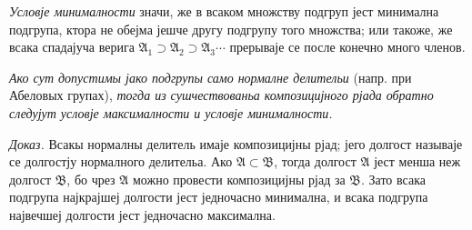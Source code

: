 ﻿\documentclass[11pt]{article}
\providecommand{\mA}{\mathfrak{A}}
\providecommand{\mB}{\mathfrak{B}}
\begin{document}
\emph{Условје минималности} значи, же в всаком множству подгруп јест минимална подгрупа, ктора не обејма јешче другу подгрупу того множства; или такоже, же всака спадајуча верига $\mA_1\supset\mA_2\supset\mA_3\cdots$ прерываје се после конечно много членов.

\emph{Ако сут допустимы јако подгрупы само нормалне делительи} (напр. при Абеловых групах), \emph{тогда из сушчествованьа композицијного рјада обратно следујут условје максималности и условје минималности.}

\emph{Доказ.} Всакы нормалны делитель имаје композицијны рјад; јего долгост называје се долгостју нормалного делительа. Ако $\mA\subset\mB$, тогда долгост $\mA$ јест менша неж долгост $\mB$, бо чрез $\mA$ можно провести композицијны рјад за $\mB$. Зато всака подгрупа најкрајшеј долгости јест једночасно минимална, и всака подгрупа највечшеј долгости јест једночасно максимална.
\end{document}
